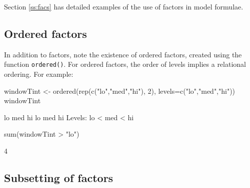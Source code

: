 \documentclass{tufte-book}\usepackage[]{graphicx}\usepackage[]{color}
\newcommand{\txtt}[1]{\texttt{#1}}
\begin{document}
Section \ref{ss:facs} has detailed examples of the use of factors
in model formulae.

\subsection*{Ordered factors}
In addition to factors, note the existence of ordered factors, created
using the function \txtt{ordered()}.  For ordered factors, the order
of levels implies a relational ordering.  For example:
\begin{Schunk}
\begin{Sinput}
windowTint <- ordered(rep(c("lo","med","hi"), 2),
                      levels=c("lo","med","hi"))
windowTint
\end{Sinput}
\begin{Soutput}
[1] lo  med hi  lo  med hi 
Levels: lo < med < hi
\end{Soutput}
\begin{Sinput}
sum(windowTint > "lo")
\end{Sinput}
\begin{Soutput}
[1] 4
\end{Soutput}
\end{Schunk}

\subsection*{Subsetting of factors}
\end{document}

